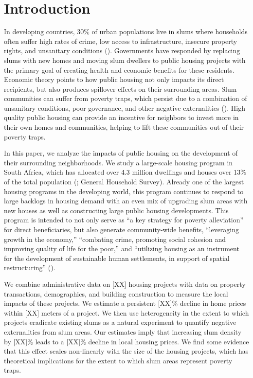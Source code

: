 \documentclass[12pt]{article}
\begin{document}
\section{Introduction} \label{sec:introduction}

In developing countries, 30\% of urban populations live in slums where households often suffer high rates of crime, low access to infrastructure, insecure property rights, and unsanitary conditions (\cite{mdg}).  Governments have responded by replacing slums with new homes and moving slum dwellers to public housing projects with the primary goal of creating health and economic benefits for these residents.  Economic theory points to how public housing not only impacts its direct recipients, but also produces spillover effects on their surrounding areas.  Slum communities can suffer from poverty traps, which persist due to a combination of unsanitary conditions, poor governance, and other negative externalities (\cite{10.1257/jep.27.4.187}).  High-quality public housing can provide an incentive for neighbors to invest more in their own homes and communities, helping to lift these communities out of their poverty traps.

In this paper, we analyze the impacts of public housing on the development of their surrounding neighborhoods.  We study a large-scale housing program in South Africa, which has allocated over 4.3 million dwellings and houses over 13\% of the total population (\cite{dhsreports}; General Household Survey).  Already one of the largest housing programs in the developing world, this program continues to respond to large backlogs in housing demand with an even mix of upgrading slum areas with new houses as well as constructing large public housing developments.  This program is intended to not only serve as ``a key strategy for poverty alleviation'' for direct beneficiaries, but also generate community-wide benefits, ``leveraging growth in the economy,'' ``combating crime, promoting social cohesion and improving quality of life for the poor,'' and ``utilizing housing as an instrument for the development of sustainable human settlements, in support of spatial restructuring'' (\cite{bng}). 

We combine administrative data on [XX] housing projects with data on property transactions, demographics, and building construction to measure the local impacts of these projects.  We estimate a persistent [XX]\% decline in home prices within [XX] meters of a project.  We then use heterogeneity in the extent to which projects eradicate existing slums as a natural experiment to quantify negative externalities from slum areas.  Our estimates imply that increasing slum density by [XX]\% leads to a [XX]\% decline in local housing prices.  We find some evidence that this effect scales non-linearly with the size of the housing projects, which has theoretical implications for the extent to which slum areas represent poverty traps.
\end{document}

